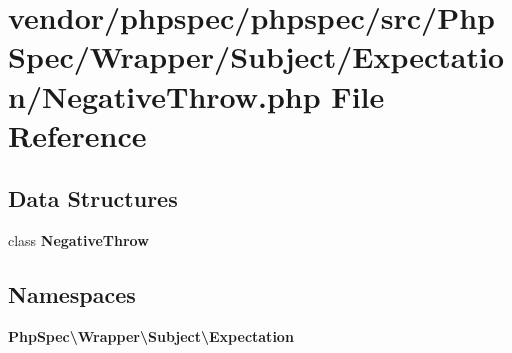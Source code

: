 \section{vendor/phpspec/phpspec/src/\+Php\+Spec/\+Wrapper/\+Subject/\+Expectation/\+Negative\+Throw.php File Reference}
\label{_negative_throw_8php}
\subsection*{Data Structures}
\begin{DoxyCompactItemize}
\item 
class {\bf Negative\+Throw}
\end{DoxyCompactItemize}
\subsection*{Namespaces}
\begin{DoxyCompactItemize}
\item 
 {\bf Php\+Spec\textbackslash{}\+Wrapper\textbackslash{}\+Subject\textbackslash{}\+Expectation}
\end{DoxyCompactItemize}
